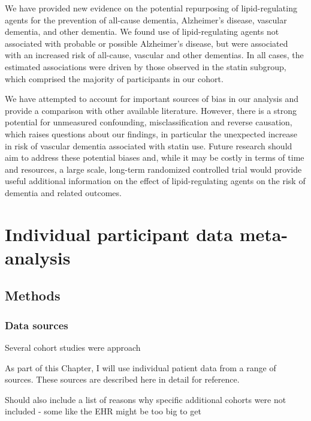 \documentclass[a4paper, twoside]{templates/ociamthesis}
\begin{document}
We have provided new evidence on the potential repurposing of lipid-regulating agents for the prevention of all-cause dementia, Alzheimer's disease, vascular dementia, and other dementia. We found use of lipid-regulating agents not associated with probable or possible Alzheimer's disease, but were associated with an increased risk of all-cause, vascular and other dementias. In all cases, the estimated associations were driven by those observed in the statin subgroup, which comprised the majority of participants in our cohort.

We have attempted to account for important sources of bias in our analysis and provide a comparison with other available literature. However, there is a strong potential for unmeasured confounding, misclassification and reverse causation, which raises questions about our findings, in particular the unexpected increase in risk of vascular dementia associated with statin use. Future research should aim to address these potential biases and, while it may be costly in terms of time and resources, a large scale, long-term randomized controlled trial would provide useful additional information on the effect of lipid-regulating agents on the risk of dementia and related outcomes.

\hypertarget{ipd-heading}{%
\chapter{Individual participant data meta-analysis}\label{ipd-heading}}

\minitoc 

\hypertarget{methods-2}{%
\section{Methods}\label{methods-2}}

\hypertarget{data-sources}{%
\subsection{Data sources}\label{data-sources}}

Several cohort studies were approach

As part of this Chapter, I will use individual patient data from a range of sources. These sources are described here in detail for reference.

Should also include a list of reasons why specific additional cohorts were not included - some like the EHR might be too big to get
\end{document}
